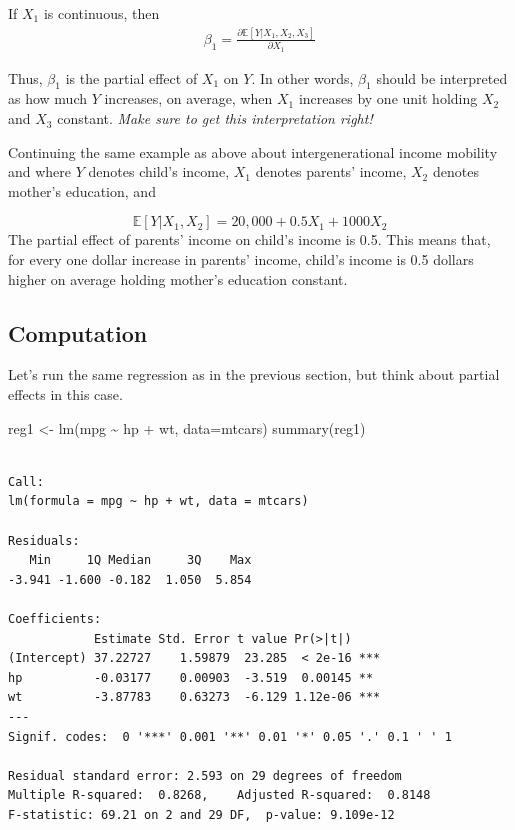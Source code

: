 \documentclass[
  letterpaper,
  DIV=11,
  numbers=noendperiod]{scrreprt}
\newenvironment{Shaded}{\begin{snugshade}}{\end{snugshade}}
\newcommand{\AttributeTok}[1]{\textcolor[rgb]{0.40,0.45,0.13}{#1}}
\newcommand{\FunctionTok}[1]{\textcolor[rgb]{0.28,0.35,0.67}{#1}}
\newcommand{\NormalTok}[1]{\textcolor[rgb]{0.00,0.23,0.31}{#1}}
\newcommand{\OtherTok}[1]{\textcolor[rgb]{0.00,0.23,0.31}{#1}}
\newcommand{\SpecialCharTok}[1]{\textcolor[rgb]{0.37,0.37,0.37}{#1}}
\begin{document}
If \(X_1\) is continuous, then \begin{align*}
  \beta_1 = \frac{\partial \mathbb{E}[Y|X_1,X_2,X_3]}{\partial X_1}
\end{align*}

Thus, \(\beta_1\) is the partial effect of \(X_1\) on \(Y\). In other
words, \(\beta_1\) should be interpreted as how much \(Y\) increases, on
average, when \(X_1\) increases by one unit holding \(X_2\) and \(X_3\)
constant. \emph{Make sure to get this interpretation right!}

Continuing the same example as above about intergenerational income
mobility and where \(Y\) denotes child's income, \(X_1\) denotes
parents' income, \(X_2\) denotes mother's education, and

\[
  \mathbb{E}[Y|X_1,X_2] = 20,000 + 0.5 X_1 + 1000 X_2
\] The partial effect of parents' income on child's income is 0.5. This
means that, for every one dollar increase in parents' income, child's
income is 0.5 dollars higher on average holding mother's education
constant.

\subsection{Computation}\label{computation-1}

Let's run the same regression as in the previous section, but think
about partial effects in this case.

\begin{Shaded}
\begin{Highlighting}[]
\NormalTok{reg1 }\OtherTok{\textless{}{-}} \FunctionTok{lm}\NormalTok{(mpg }\SpecialCharTok{\textasciitilde{}}\NormalTok{ hp }\SpecialCharTok{+}\NormalTok{ wt, }\AttributeTok{data=}\NormalTok{mtcars)}
\FunctionTok{summary}\NormalTok{(reg1)}
\end{Highlighting}
\end{Shaded}

\begin{verbatim}

Call:
lm(formula = mpg ~ hp + wt, data = mtcars)

Residuals:
   Min     1Q Median     3Q    Max 
-3.941 -1.600 -0.182  1.050  5.854 

Coefficients:
            Estimate Std. Error t value Pr(>|t|)    
(Intercept) 37.22727    1.59879  23.285  < 2e-16 ***
hp          -0.03177    0.00903  -3.519  0.00145 ** 
wt          -3.87783    0.63273  -6.129 1.12e-06 ***
---
Signif. codes:  0 '***' 0.001 '**' 0.01 '*' 0.05 '.' 0.1 ' ' 1

Residual standard error: 2.593 on 29 degrees of freedom
Multiple R-squared:  0.8268,    Adjusted R-squared:  0.8148 
F-statistic: 69.21 on 2 and 29 DF,  p-value: 9.109e-12
\end{verbatim}
\end{document}
